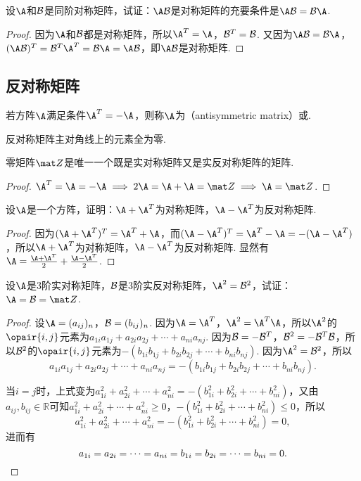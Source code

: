 \begin{example}
设\(\A\)和\(\mathcal{B}\)是同阶对称矩阵，试证：\(\A\B\)是对称矩阵的充要条件是\(\A\B = \B\A\).
\begin{proof}
因为\(\A\)和\(\mathcal{B}\)都是对称矩阵，所以\(\A^T = \A\)，\(\mathcal{B}^T = \mathcal{B}\).
又因为\(\A\B = \B\A\)，\((\A\B)^T = \B^T \A^T = \B\A = \A\B\)，即\(\A\B\)是对称矩阵.
\end{proof}
\end{example}

\subsection{反对称矩阵}
\begin{definition}
若方阵\(\A\)满足条件\(\A^T = -\A\)，则称\(\A\)为（antisymmetric matrix）或.
\end{definition}

\begin{property}
反对称矩阵主对角线上的元素全为零.
\end{property}

\begin{example}
零矩阵\(\z\)是唯一一个既是实对称矩阵又是实反对称矩阵的矩阵.
\begin{proof}
\(\A^T = \A = -\A \implies 2\A = \A+\A = \z \implies \A = \z\).
\end{proof}
\end{example}

\begin{example}
设\(\A\)是一个方阵，证明：\(\A+\A^T\)为对称矩阵，\(\A-\A^T\)为反对称矩阵.
\begin{proof}
因为\((\A+\A^T)^T = \A^T+\A\)，而\((\A-\A^T)^T = \A^T - \A = -(\A-\A^T)\)，所以\(\A+\A^T\)为对称矩阵，\(\A-\A^T\)为反对称矩阵.
显然有\(\A = \frac{\A + \A^T}{2} + \frac{\A - \A^T}{2}\).
\end{proof}
\end{example}

\begin{example}
设\(\A\)是3阶实对称矩阵，\(\mathcal{B}\)是3阶实反对称矩阵，\(\A^2 = \B^2\)，试证：\(\A = \B = \z\).
\begin{proof}
设\(\A = (a_{ij})_n\)，\(\mathcal{B} = (b_{ij})_n\).
因为\(\A = \A^T\)，\(\A^2 = \A^T \A\)，所以\(\A^2\)的\(\opair{i,j}\)元素为\(a_{1i} a_{1j} + a_{2i} a_{2j} + \dotsb + a_{ni} a_{nj}\).
因为\(\mathcal{B} = -\mathcal{B}^T\)，\(\mathcal{B}^2 = -\mathcal{B}^T \mathcal{B}\)，所以\(\mathcal{B}^2\)的\(\opair{i,j}\)元素为\(-(b_{1i} b_{1j} + b_{2i} b_{2j} + \dotsb + b_{ni} b_{nj})\).
因为\(\A^2 = \B^2\)，所以\[
a_{1i} a_{1j} + a_{2i} a_{2j} + \dotsb + a_{ni} a_{nj}
= -(b_{1i} b_{1j} + b_{2i} b_{2j} + \dotsb + b_{ni} b_{nj}).
\]

当\(i=j\)时，上式变为\(
a_{1i}^2 + a_{2i}^2 + \dotsb + a_{ni}^2
= -(b_{1i}^2 + b_{2i}^2 + \dotsb + b_{ni}^2)
\)，又由\(a_{ij},b_{ij} \in \mathbb{R}\)可知\(a_{1i}^2 + a_{2i}^2 + \dotsb + a_{ni}^2 \geqslant 0\)，\(-(b_{1i}^2 + b_{2i}^2 + \dotsb + b_{ni}^2) \leqslant 0\)，所以\[
a_{1i}^2 + a_{2i}^2 + \dotsb + a_{ni}^2
= -(b_{1i}^2 + b_{2i}^2 + \dotsb + b_{ni}^2) = 0,
\]进而有\[
a_{1i} = a_{2i} = \dotsb = a_{ni} = b_{1i} = b_{2i} = \dotsb = b_{ni} = 0.
\qedhere
\]
\end{proof}
\end{example}

